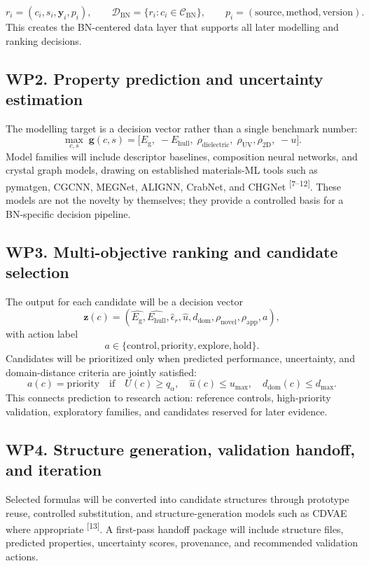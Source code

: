 \documentclass[10pt]{article}
\newcommand{\eg}{E_{\mathrm{g}}}
\newcommand{\ehull}{E_{\mathrm{hull}}}
\newcommand{\unc}{u}
\newcommand{\domain}{d_{\mathrm{dom}}}
\newcommand{\utility}{U}
\begin{document}
\[
  r_i=(c_i,s_i,\mathbf{y}_i,p_i),\qquad
  \mathcal{D}_{\mathrm{BN}}=\{r_i:c_i\in\mathcal{C}_{\mathrm{BN}}\},\qquad
  p_i=(\mathrm{source},\mathrm{method},\mathrm{version}).
\]
This creates the BN-centered data layer that supports all later modelling and ranking decisions.

\subsection*{WP2. Property prediction and uncertainty estimation}
The modelling target is a decision vector rather than a single benchmark number:
\[
  \max_{c,s}\; \mathbf{g}(c,s)=
  \big[\eg,\;-\ehull,\;\rho_{\mathrm{dielectric}},\;\rho_{\mathrm{UV}},
  \rho_{\mathrm{2D}},\;-\unc\big].
\]
Model families will include descriptor baselines, composition neural networks, and crystal graph models, drawing on established materials-ML tools such as pymatgen, CGCNN, MEGNet, ALIGNN, CrabNet, and CHGNet \textsuperscript{[7--12]}. These models are not the novelty by themselves; they provide a controlled basis for a BN-specific decision pipeline.

\subsection*{WP3. Multi-objective ranking and candidate selection}
The output for each candidate will be a decision vector
\[
  \mathbf{z}(c)=
  (\hat{\eg},\hat{\ehull},\hat{\epsilon}_r,\hat{\unc},\domain,
  \rho_{\mathrm{novel}},\rho_{\mathrm{app}},a),
\]
with action label
\[
  a\in\{\mathrm{control},\mathrm{priority},\mathrm{explore},\mathrm{hold}\}.
\]
Candidates will be prioritized only when predicted performance, uncertainty, and domain-distance criteria are jointly satisfied:
\[
  a(c)=\mathrm{priority}\quad\mathrm{if}\quad
  \utility(c)\ge q_{\alpha},\quad \hat{\unc}(c)\le u_{\max},\quad
  \domain(c)\le d_{\max}.
\]
This connects prediction to research action: reference controls, high-priority validation, exploratory families, and candidates reserved for later evidence.

\subsection*{WP4. Structure generation, validation handoff, and iteration}
Selected formulas will be converted into candidate structures through prototype reuse, controlled substitution, and structure-generation models such as CDVAE where appropriate \textsuperscript{[13]}. A first-pass handoff package will include structure files, predicted properties, uncertainty scores, provenance, and recommended validation actions.
\end{document}
